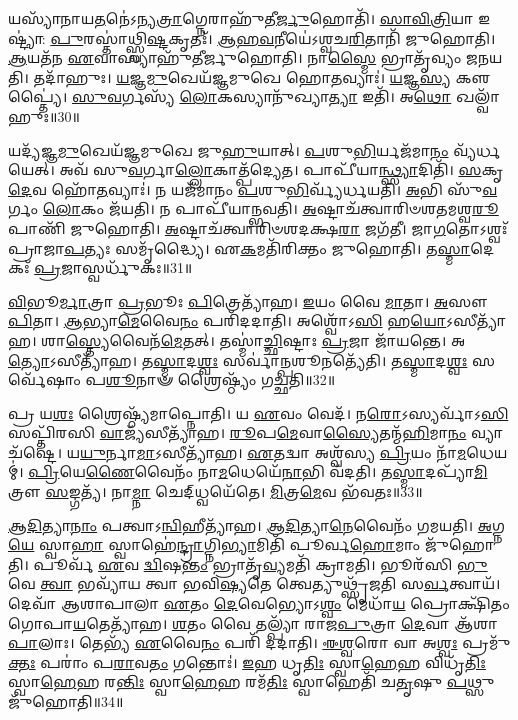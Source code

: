 𑌯𑌸𑍍𑌯𑌾᳴𑌨𑌾𑌯\-\ul{𑌤}\-𑌨𑍇॑\-𑌽𑌨𑍍𑌯\-\ul{𑌤𑍍𑌰𑌾}\-𑌗𑍍𑌨𑍇𑌰𑌾𑌹𑍁᳴𑌤𑍀\-\ul{𑌰𑍍𑌜𑍁}\-𑌹𑍋𑌤𑌿᳴।
\-\ul{𑌸𑌾}\-\-\ul{𑌵𑌿}\-\-\ul{𑌤𑍍𑌰𑌿}\-𑌯𑌾 𑌇𑌷𑍍𑌟𑍍𑌯𑌾॑: \ul{𑌪𑍁}\-𑌰𑌸𑍍𑌤𑌾॑𑌥𑍍𑌸𑍍𑌵𑌿\-\ul{𑌷𑍍𑌟}\-𑌕𑍃𑌤𑌃᳴।
\-\ul{𑌆}\-\-\ul{𑌹}\-\-\ul{𑌵}\-𑌨𑍀𑌯𑍇॑\-𑌽𑌶𑍍𑌵𑌚\-\ul{𑌰𑌿}\-𑌤𑌾𑌨𑌿᳴ 𑌜𑍁𑌹𑍋𑌤𑌿।
\-\ul{𑌆}\-𑌯𑌤᳴𑌨 \ul{𑌏}\-𑌵𑌾𑌸𑍍𑌯𑌾𑌹𑍁᳴𑌤𑍀𑌰𑍍𑌜𑍁𑌹𑍋𑌤𑌿।
𑌨𑌾\-\ul{𑌸𑍍𑌮𑍈} 𑌭𑍍𑌰𑌾𑌤𑍃᳴𑌵𑍍𑌯𑌂 𑌜𑌨𑌯𑌤𑌿।
𑌤𑌦𑌾᳴𑌹𑍁𑌃।
\-\ul{𑌯}\-\-\ul{𑌜𑍍𑌞}\-\-\ul{𑌮𑍁}\-𑌖𑍇𑌯᳴𑌜𑍍𑌞𑌮𑍁𑌖𑍇 𑌹𑍋\-\ul{𑌤}\-𑌵𑍍𑌯𑌾𑌃॑।
\-\ul{𑌯}\-𑌜𑍍𑌞\-\ul{𑌸𑍍𑌯} 𑌕𑍢𑌪𑍍𑌤𑍍𑌯𑍈॑।
\-\ul{𑌸𑍁}\-\-\ul{𑌵}\-𑌰𑍍𑌗𑌸𑍍𑌯᳴ \ul{𑌲𑍋}\-𑌕𑌸𑍍𑌯𑌾𑌨𑍁᳴𑌖𑍍𑌯𑌾\-\ul{𑌤𑍍𑌯𑌾} 𑌇𑌤𑌿᳴।
𑌅\-\ul{𑌥𑍋} 𑌖𑌲𑍍𑌵𑌾᳴𑌹𑍁𑌃॥30॥

𑌯𑌦𑍍𑌯᳴𑌜𑍍𑌞\-\ul{𑌮𑍁}\-𑌖𑍇𑌯᳴𑌜𑍍𑌞𑌮𑍁𑌖𑍇 𑌜𑍁\-\ul{𑌹𑍁}\-𑌯𑌾𑌤𑍍।
\-\ul{𑌪}\-𑌶𑍁\-\ul{𑌭𑌿}\-𑌰𑍍𑌯𑌜᳴𑌮𑌾\-\ul{𑌨𑌂} 𑌵𑍍𑌯᳴𑌰𑍍𑌧𑌯𑍇𑌤𑍍।
𑌅𑌵᳴ 𑌸𑍁\-\ul{𑌵}\-𑌰𑍍𑌗𑌾\-\ul{𑌲𑍍𑌲𑍋}\-𑌕𑌾𑌤𑍍𑌪᳴𑌦𑍍𑌯𑍇𑌤।
𑌪𑌾𑌪𑍀᳴𑌯𑌾\-\ul{𑌨𑍍𑌥𑍍𑌸𑍍𑌯𑌾}\-𑌦𑌿𑌤𑌿᳴।
\-\ul{𑌸}\-𑌕𑍃\-\ul{𑌦𑍇}\-𑌵 𑌹𑍋᳴\-\ul{𑌤}\-𑌵𑍍𑌯𑌾𑌃॑।
𑌨 𑌯𑌜᳴𑌮𑌾𑌨𑌂 \ul{𑌪}\-𑌶𑍁\-\ul{𑌭𑌿}\-𑌰𑍍𑌵𑍍𑌯᳴𑌰𑍍𑌧𑌯𑌤𑌿।
\-\ul{𑌅}\-𑌭𑌿 𑌸𑍁᳴\-\ul{𑌵}\-𑌰𑍍𑌗𑌂 \ul{𑌲𑍋}\-𑌕𑌂 𑌜᳴𑌯𑌤𑌿।
𑌨 𑌪𑌾𑌪𑍀᳴𑌯𑌾𑌨𑍍𑌭𑌵𑌤𑌿।
\-\ul{𑌅}\-𑌷𑍍𑌟𑌾𑌚᳴𑌤𑍍𑌵𑌾𑌰𑌿𑍞𑌶𑌤𑌮𑌶𑍍𑌵\-\ul{𑌰𑍂}\-𑌪𑌾𑌣𑌿᳴ 𑌜𑍁𑌹𑍋𑌤𑌿।
\-\ul{𑌅}\-𑌷𑍍𑌟𑌾𑌚᳴𑌤𑍍𑌵𑌾𑌰𑌿𑍞𑌶𑌦𑌕𑍍𑌷\-\ul{𑌰𑌾} 𑌜𑌗᳴𑌤𑍀।
𑌜𑌾\-\ul{𑌗}\-𑌤𑍋\-𑌽𑌶𑍍𑌵𑌃᳴ 𑌪𑍍𑌰𑌾𑌜𑌾\-\ul{𑌪}\-𑌤𑍍𑌯𑌃 𑌸𑌮𑍃᳴𑌦𑍍𑌧𑍍𑌯𑍈।
𑌏\-\ul{𑌕}\-𑌮𑌤𑌿᳴𑌰𑌿𑌕𑍍𑌤𑌂 𑌜𑍁𑌹𑍋𑌤𑌿।
𑌤\-\ul{𑌸𑍍𑌮𑌾}\-𑌦𑍇𑌕𑌃᳴ \ul{𑌪𑍍𑌰}\-𑌜𑌾𑌸𑍍𑌵𑌰𑍍𑌧𑍁᳴𑌕𑌃॥31॥\anuvakamend[\-\ul{𑌅}\-\-\ul{𑌰𑍍𑌧}\-\-\ul{𑌯}\-\-\ul{𑌤𑌿} \ul{𑌜}\-\-\ul{𑌨}\-\-\ul{𑌯}\-\-\ul{𑌤𑌿} 𑌖𑌲𑍍𑌵𑌾᳴\-\ul{𑌹𑍁}\-𑌰𑍍𑌜𑌗᳴\-\ul{𑌤𑍀} 𑌤𑍍𑌰𑍀𑌣𑌿᳴ 𑌚]

\-\ul{𑌵𑌿}\-𑌭𑍂\-\ul{𑌰𑍍𑌮𑌾}\-𑌤𑍍𑌰𑌾 \ul{𑌪𑍍𑌰}\-𑌭𑍂𑌃 \ul{𑌪𑌿}\-𑌤𑍍𑌰𑍇𑌤𑍍𑌯𑌾᳴𑌹।
\-\ul{𑌇}\-𑌯𑌂 𑌵𑍈 \ul{𑌮𑌾}\-𑌤𑌾।
\-\ul{𑌅}\-𑌸𑍗 \ul{𑌪𑌿}\-𑌤𑌾।
\-\ul{𑌆}\-𑌭𑍍𑌯𑌾\-\ul{𑌮𑍇}\-𑌵𑍈\-\ul{𑌨𑌂} 𑌪𑌰𑌿᳴𑌦𑌦𑌾𑌤𑌿।
𑌅𑌶𑍍𑌵𑍋᳴𑌽\-\ul{𑌸𑌿} 𑌹\-\ul{𑌯𑍋}\-\-𑌽𑌸𑍀𑌤𑍍𑌯𑌾᳴𑌹।
𑌶𑌾\-\ul{𑌸𑍍𑌤𑍍𑌯𑍇}\-𑌵𑍈𑌨᳴\-\ul{𑌮𑍇}\-𑌤𑌤𑍍।
𑌤𑌸𑍍𑌮𑌾॑\-\ul{𑌚𑍍𑌛𑌿}\-𑌷𑍍𑌟𑌾𑌃 \ul{𑌪𑍍𑌰}\-𑌜𑌾 𑌜𑌾᳴𑌯𑌨𑍍𑌤𑍇।
𑌅\-\ul{𑌤𑍍𑌯𑍋}\-\-𑌽𑌸𑍀𑌤𑍍𑌯𑌾᳴𑌹।
𑌤\-\ul{𑌸𑍍𑌮𑌾}\-𑌦\-\ul{𑌶𑍍𑌵𑌃} 𑌸𑌰𑍍𑌵𑌾॑\-\ul{𑌨𑍍𑌪}\-𑌶𑍂𑌨𑌤𑍍𑌯𑍇᳴𑌤𑌿।
𑌤\-\ul{𑌸𑍍𑌮𑌾}\-𑌦\-\ul{𑌶𑍍𑌵𑌃} 𑌸𑌰𑍍𑌵𑍇᳴𑌷𑌾𑌂 𑌪\-\ul{𑌶𑍂}\-𑌨𑌾𑍟 𑌶𑍍𑌰𑍈𑌷𑍍𑌠𑍍𑌯𑌂᳴ 𑌗𑌚𑍍𑌛𑌤𑌿॥32॥

𑌪𑍍𑌰 𑌯\-\ul{𑌶𑌃} 𑌶𑍍𑌰𑍈𑌷𑍍𑌠𑍍𑌯᳴𑌮𑌾𑌪𑍍𑌨𑍋𑌤𑌿।
𑌯 \ul{𑌏}\-𑌵𑌂 𑌵𑍇𑌦᳴।
𑌨\-\ul{𑌰𑍋}\-𑌽𑌸𑍍𑌯𑌰𑍍𑌵𑌾᳴𑌽\-\ul{𑌸𑌿} 𑌸𑌪𑍍𑌤𑌿᳴𑌰𑌸𑌿 \ul{𑌵𑌾}\-𑌜𑍍𑌯᳴𑌸𑍀𑌤𑍍𑌯𑌾᳴𑌹।
\-\ul{𑌰𑍂}\-𑌪\-\ul{𑌮𑍇}\-𑌵𑌾\-\ul{𑌸𑍍𑌯𑍈}\-𑌤𑌨𑍍𑌮᳴\-\ul{𑌹𑌿}\-𑌮𑌾\-\ul{𑌨𑌂} 𑌵𑍍𑌯𑌾𑌚᳴𑌷𑍍𑌟𑍇।
𑌯\-\ul{𑌯𑍁}\-𑌰𑍍𑌨𑌾\-\ul{𑌮𑌾}\-\-𑌽𑌸𑍀𑌤𑍍𑌯𑌾᳴𑌹।
\-\ul{𑌏}\-𑌤𑌦𑍍𑌵𑌾 𑌅𑌶𑍍𑌵᳴𑌸𑍍𑌯 \ul{𑌪𑍍𑌰𑌿}\-𑌯𑌂 𑌨𑌾᳴\-\ul{𑌮}\-𑌧𑍇𑌯𑌮𑍍॑।
\-\ul{𑌪𑍍𑌰𑌿}\-𑌯𑍇\-\ul{𑌣𑍈}\-𑌵𑍈𑌨𑌂᳴ 𑌨𑌾\-\ul{𑌮}\-𑌧𑍇𑌯𑍇᳴\-\ul{𑌨𑌾}\-𑌭𑌿 𑌵᳴𑌦𑌤𑌿।
𑌤\-\ul{𑌸𑍍𑌮𑌾}\-𑌦𑌪𑍍𑌯𑌾᳴\-\ul{𑌮𑌿}\-𑌤𑍍𑌰𑍗 \ul{𑌸}\-𑌙𑍍𑌗𑌤𑍍𑌯᳴।
𑌨𑌾\-\ul{𑌮𑍍𑌨𑌾} 𑌚𑍇𑌦𑍍‌𑌧𑍍𑌵𑌯𑍇᳴𑌤𑍇।
\-\ul{𑌮𑌿}\-𑌤𑍍𑌰\-\ul{𑌮𑍇}\-𑌵 𑌭᳴𑌵𑌤𑌃॥33॥

\-\ul{𑌆}\-\-\ul{𑌦𑌿}\-𑌤𑍍𑌯𑌾\-\ul{𑌨𑌾𑌂} 𑌪𑌤𑍍𑌵𑌾\-𑌽\-\ul{𑌨𑍍𑌵𑌿}\-𑌹𑍀𑌤𑍍𑌯𑌾᳴𑌹।
\-\ul{𑌆}\-\-\ul{𑌦𑌿}\-𑌤𑍍𑌯𑌾\-\ul{𑌨𑍇}\-𑌵𑍈𑌨𑌂᳴ 𑌗𑌮𑌯𑌤𑌿।
\-\ul{𑌅}\-𑌗𑍍𑌨\-\ul{𑌯𑍇} 𑌸𑍍𑌵𑌾\-\ul{𑌹𑌾} 𑌸𑍍𑌵𑌾𑌹𑍇॑\-\ul{𑌨𑍍𑌦𑍍𑌰𑌾}\-𑌗𑍍𑌨𑌿\-\ul{𑌭𑍍𑌯𑌾}\-𑌮𑌿𑌤𑌿᳴ 𑌪𑍂𑌰𑍍𑌵\-\ul{𑌹𑍋}\-𑌮𑌾𑌂 𑌜𑍁᳴𑌹𑍋𑌤𑌿।
𑌪𑍂𑌰𑍍𑌵᳴ \ul{𑌏}\-𑌵 \ul{𑌦𑍍𑌵𑌿}\-𑌷\-\ul{𑌨𑍍𑌤𑌂} 𑌭𑍍𑌰𑌾𑌤𑍃᳴\-\ul{𑌵𑍍𑌯}\-𑌮𑌤𑌿᳴ 𑌕𑍍𑌰𑌾𑌮𑌤𑌿।
𑌭𑍂𑌰᳴𑌸𑌿 \ul{𑌭𑍁}\-𑌵𑍇 \ul{𑌤𑍍𑌵𑌾} 𑌭𑌵𑍍𑌯𑌾᳴𑌯 𑌤𑍍𑌵𑌾 𑌭𑌵𑌿\-\ul{𑌷𑍍𑌯}\-𑌤𑍇 𑌤𑍍𑌵𑍇𑌤𑍍𑌯𑍁𑌥𑍍𑌸𑍃᳴𑌜𑌤𑌿 𑌸\-\ul{𑌰𑍍𑌵}\-𑌤𑍍𑌵𑌾𑌯᳴।
𑌦𑍇𑌵𑌾᳴ 𑌆𑌶𑌾𑌪𑌾𑌲𑌾 \ul{𑌏}\-𑌤𑌂 \ul{𑌦𑍇}\-𑌵𑍇𑌭𑍍𑌯𑍋\-𑌽\-\ul{𑌶𑍍𑌵𑌂} 𑌮𑍇𑌧𑌾᳴\-\ul{𑌯} 𑌪𑍍𑌰𑍋𑌕𑍍𑌷𑌿᳴𑌤𑌂 𑌗𑍋𑌪𑌾\-\ul{𑌯}\-𑌤𑍇𑌤𑍍𑌯𑌾᳴𑌹।
\-\ul{𑌶}\-𑌤𑌂 𑌵𑍈 𑌤𑌲𑍍𑌪𑍍𑌯𑌾᳴ 𑌰𑌾𑌜\-\ul{𑌪𑍁}\-𑌤𑍍𑌰𑌾 \ul{𑌦𑍇}\-𑌵𑌾 𑌆᳴𑌶𑌾\-\ul{𑌪𑌾}\-𑌲𑌾𑌃।
𑌤𑍇𑌭𑍍𑌯᳴ \ul{𑌏}\-𑌵𑍈\-\ul{𑌨𑌂} 𑌪𑌰𑌿᳴ 𑌦𑌦𑌾𑌤𑌿।
\-\ul{𑌈}\-\-\ul{𑌶𑍍𑌵}\-𑌰𑍋 𑌵𑌾 𑌅\-\ul{𑌶𑍍𑌵𑌃} 𑌪𑍍𑌰𑌮𑍁᳴\-\ul{𑌕𑍍𑌤𑌃} 𑌪𑌰𑌾𑌂॑ 𑌪\-\ul{𑌰𑌾}\-𑌵\-\ul{𑌤𑌂} 𑌗𑌨𑍍𑌤𑍋𑌃॑।
\-\ul{𑌇}\-𑌹 𑌧𑍃\-\ul{𑌤𑌿𑌃} 𑌸𑍍𑌵𑌾\-\ul{𑌹𑍇}\-𑌹 𑌵𑌿𑌧𑍃᳴\-\ul{𑌤𑌿𑌃} 𑌸𑍍𑌵𑌾\-\ul{𑌹𑍇}\-𑌹 𑌰\-\ul{𑌨𑍍𑌤𑌿𑌃} 𑌸𑍍𑌵𑌾\-\ul{𑌹𑍇}\-𑌹 𑌰𑌮᳴\-\ul{𑌤𑌿𑌃} 𑌸𑍍𑌵𑌾𑌹𑍇𑌤𑌿᳴ 𑌚\-\ul{𑌤𑍃}\-𑌷𑍁 \ul{𑌪}\-𑌥𑍍𑌸𑍁 𑌜𑍁᳴𑌹𑍋𑌤𑌿॥34॥

